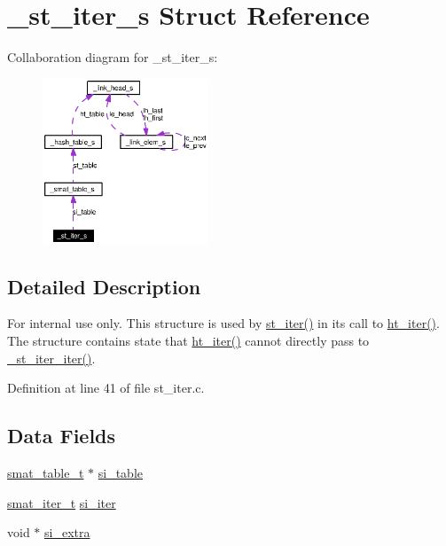 \hypertarget{struct__st__iter__s}{
\section{\_\-st\_\-iter\_\-s Struct Reference}
\label{struct__st__iter__s}
}
Collaboration diagram for \_\-st\_\-iter\_\-s:\begin{figure}[H]
\begin{center}
\leavevmode
\includegraphics[width=140pt]{struct__st__iter__s__coll__graph}
\end{center}
\end{figure}


\subsection{Detailed Description}
\begin{Desc}
\item[For internal use only.]
This structure is used by \hyperlink{group__dbprim__smat_ga16}{st\_\-iter()} in its call to \hyperlink{group__dbprim__hash_ga14}{ht\_\-iter()}. The structure contains state that \hyperlink{group__dbprim__hash_ga14}{ht\_\-iter()} cannot directly pass to \hyperlink{group__dbprim__smat_ga31}{\_\-st\_\-iter\_\-iter()}.\end{Desc}




Definition at line 41 of file st\_\-iter.c.\subsection*{Data Fields}
\begin{CompactItemize}
\item 
\hyperlink{struct__smat__table__s}{smat\_\-table\_\-t} $\ast$ \hyperlink{struct__st__iter__s_o0}{si\_\-table}
\item 
\hyperlink{group__dbprim__smat_ga4}{smat\_\-iter\_\-t} \hyperlink{struct__st__iter__s_o1}{si\_\-iter}
\item 
void $\ast$ \hyperlink{struct__st__iter__s_o2}{si\_\-extra}
\end{CompactItemize}


